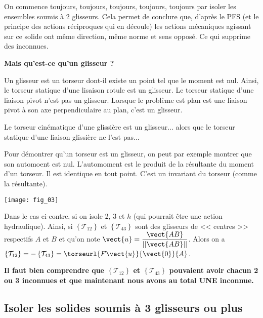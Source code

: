 On commence toujours, \large{toujours}, \Large{toujours}, \LARGE{toujours}, \huge{toujours} \normalsize par isoler les ensembles soumis à 2 glisseurs. Cela permet de conclure que, d'après le PFS (et le principe des actions réciproques qui en découle) les actions mécaniques agissant sur ce solide ont même direction, même norme et sens opposé. Ce qui supprime des inconnues.

\textbf{Mais qu'est-ce qu'un glisseur ?}

Un glisseur est un torseur dont-il existe un point tel que le moment est nul. Ainsi, le torseur statique d'une lisaison rotule est un glisseur. Le torseur statique d'une liaison pivot n'est pas un glisseur. Lorsque le problème est plan est une liaison pivot à son axe perpendiculaire au plan, c'est un glisseur. 

Le torseur cinématique d'une glissière est un glisseur... alors que le torseur statique d'une liaison glissière ne l'est pas... 

\begin{remarque}
Pour démontrer qu'un torseur est un glisseur, on peut par exemple montrer que son automoent est nul. L'automoment est le produit de la résultante du moment d'un torseur. Il est identique en tout point. C'est un invariant du torseur (comme la résultante).
\end{remarque}

\begin{marginfigure}
\texttt{[image: fig\_03]}
\end{marginfigure}

Dans le cas ci-contre, si on isole 2, 3 et $h$ (qui pourrait être une action hydraulique). Ainsi, si $\left\{\mathcal{T}_{12}\right\}$ et $\left\{\mathcal{T}_{43}\right\}$ sont des glisseurs de << centres >> respectifs $A$ et $B$ et qu'on note $\vect{u}=\dfrac{\vect{AB}}{||\vect{AB}||}$. Alors on a $\left\{\mathcal{T}_{12}\right\}=-\left\{\mathcal{T}_{43}\right\}=\torseurl{F\vect{u}}{\vect{0}}{A}$. 

\textbf{Il faut bien comprendre que $\left\{\mathcal{T}_{12}\right\}$ et $\left\{\mathcal{T}_{43}\right\}$  pouvaient avoir chacun 2 ou 3 inconnues et que maintenant nous avons au total UNE inconnue.}


\subsection{Isoler les solides soumis à 3 glisseurs ou plus}

